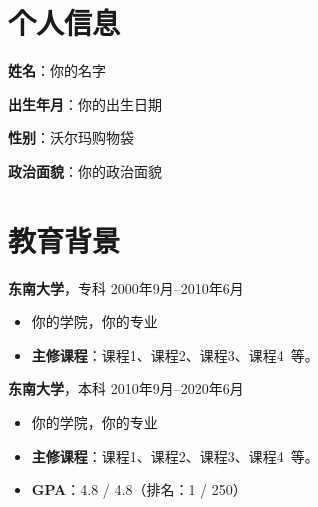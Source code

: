 \documentclass[11pt]{article}
\newlength{\iconwidth}
\begin{document}
    \begin{minipage}[t]{0.78\textwidth}
        \begin{minipage}[t]{\textwidth}
        \section[个人信息]{\quad 个人信息}
        \begin{minipage}[t]{0.5\textwidth}
            \textbf{姓\qquad 名}：你的名字
            
            \vspace{0.5em}
            \textbf{出生年月}：你的出生日期
        \end{minipage}
        \begin{minipage}[t]{0.35\textwidth}
            \textbf{性\qquad 别}：沃尔玛购物袋
            
            \vspace{0.5em}
            \textbf{政治面貌}：你的政治面貌
        \end{minipage}
        \vspace{1.2em}
        \end{minipage}

        \begin{minipage}[t]{\textwidth}
        \section[教育背景]{\quad 教育背景}
        
        {\large \textbf{东南大学}}，专科 \hfill 2000年9月--2010年6月
        \begin{itemize}
            \item 你的学院，你的专业
            \item \textbf{主修课程}：课程1、课程2、课程3、课程4\ 等。
        \end{itemize}
        
        \vspace{0.5em}
        {\large \textbf{东南大学}}，本科 \hfill 2010年9月--2020年6月
        \begin{itemize}
            \item 你的学院，你的专业
            \item \textbf{主修课程}：课程1、课程2、课程3、课程4\ 等。
            \item \textbf{GPA}：4.8 / 4.8（排名：1 / 250）
        \end{itemize}
        

\end{minipage}
\end{minipage}
\end{document}
